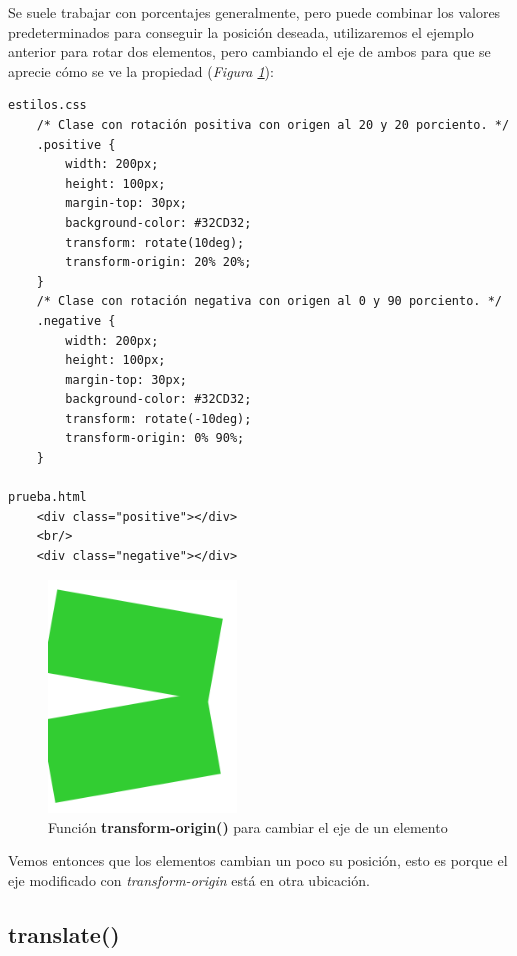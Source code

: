 Se suele trabajar con porcentajes generalmente, pero puede combinar los valores predeterminados para conseguir la posición deseada, utilizaremos el ejemplo anterior para rotar dos elementos, pero cambiando el eje de ambos para que se aprecie cómo se ve la propiedad (\textit{Figura \ref{fig: 53}}):
\begin{lstlisting}
estilos.css
    /* Clase con rotación positiva con origen al 20 y 20 porciento. */
    .positive {
        width: 200px;
        height: 100px;
        margin-top: 30px;
        background-color: #32CD32;
        transform: rotate(10deg);
        transform-origin: 20% 20%;
    }
    /* Clase con rotación negativa con origen al 0 y 90 porciento. */
    .negative {
        width: 200px;
        height: 100px;
        margin-top: 30px;
        background-color: #32CD32;
        transform: rotate(-10deg);
        transform-origin: 0% 90%;
    }

prueba.html
    <div class="positive"></div>
    <br/>
    <div class="negative"></div>
\end{lstlisting}
\begin{figure}[H]
    \centering
    \caption{Función \textbf{transform-origin()} para cambiar el eje de un elemento}
    \label{fig: 53}
    \includegraphics[width=5cm]{ss/transform-origin.png}
\end{figure}

Vemos entonces que los elementos cambian un poco su posición, esto es porque el eje modificado con \textit{transform-origin} está en otra ubicación.


\subsection{translate()}

